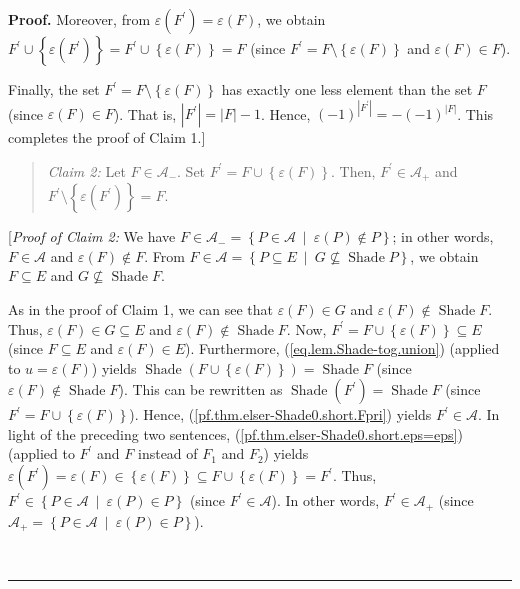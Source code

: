 \documentclass[numbers=enddot,12pt,final,onecolumn]{scrartcl}%
\theoremstyle{definition}
\newenvironment{statement}{\begin{quote}}{\end{quote}}
\newenvironment{proof}[1][Proof]{\noindent\textbf{#1.} }{\ \rule{0.5em}{0.5em}}
\newenvironment{vershort}{}{}
\begin{document}
\begin{vershort}
\begin{proof}
Moreover, from $\varepsilon\left(  F^{\prime}\right)  =\varepsilon\left(
F\right)  $, we obtain $F^{\prime}\cup\left\{  \varepsilon\left(  F^{\prime
}\right)  \right\}  =F^{\prime}\cup\left\{  \varepsilon\left(  F\right)
\right\}  =F$ (since $F^{\prime}=F\setminus\left\{  \varepsilon\left(
F\right)  \right\}  $ and $\varepsilon\left(  F\right)  \in F$).

Finally, the set $F^{\prime}=F\setminus\left\{  \varepsilon\left(  F\right)
\right\}  $ has exactly one less element than the set $F$ (since
$\varepsilon\left(  F\right)  \in F$). That is, $\left\vert F^{\prime
}\right\vert =\left\vert F\right\vert -1$. Hence, $\left(  -1\right)
^{\left\vert F^{\prime}\right\vert }=-\left(  -1\right)  ^{\left\vert
F\right\vert }$. This completes the proof of Claim 1.]

\begin{statement}
\textit{Claim 2:} Let $F\in\mathcal{A}_{-}$. Set $F^{\prime}=F\cup\left\{
\varepsilon\left(  F\right)  \right\}  $. Then, $F^{\prime}\in\mathcal{A}_{+}$
and $F^{\prime}\setminus\left\{  \varepsilon\left(  F^{\prime}\right)
\right\}  =F$.
\end{statement}

[\textit{Proof of Claim 2:} We have $F\in\mathcal{A}_{-}=\left\{
P\in\mathcal{A}\ \mid\ \varepsilon\left(  P\right)  \notin P\right\}  $; in
other words, $F\in\mathcal{A}$ and $\varepsilon\left(  F\right)  \notin F$.
From $F\in\mathcal{A}=\left\{  P\subseteq E\ \mid\ G\not \subseteq
\operatorname*{Shade}P\right\}  $, we obtain $F\subseteq E$ and
$G\not \subseteq \operatorname*{Shade}F$.

As in the proof of Claim 1, we can see that $\varepsilon\left(  F\right)  \in
G$ and $\varepsilon\left(  F\right)  \notin\operatorname*{Shade}F$. Thus,
$\varepsilon\left(  F\right)  \in G\subseteq E$ and $\varepsilon\left(
F\right)  \notin\operatorname*{Shade}F$. Now, $F^{\prime}=F\cup\left\{
\varepsilon\left(  F\right)  \right\}  \subseteq E$ (since $F\subseteq E$ and
$\varepsilon\left(  F\right)  \in E$). Furthermore,
(\ref{eq.lem.Shade-tog.union}) (applied to $u=\varepsilon\left(  F\right)  $)
yields $\operatorname*{Shade}\left(  F\cup\left\{  \varepsilon\left(
F\right)  \right\}  \right)  =\operatorname*{Shade}F$ (since $\varepsilon
\left(  F\right)  \notin\operatorname*{Shade}F$). This can be rewritten as
$\operatorname*{Shade}\left(  F^{\prime}\right)  =\operatorname*{Shade}F$
(since $F^{\prime}=F\cup\left\{  \varepsilon\left(  F\right)  \right\}  $).
Hence, (\ref{pf.thm.elser-Shade0.short.Fpri}) yields $F^{\prime}\in
\mathcal{A}$. In light of the preceding two sentences,
(\ref{pf.thm.elser-Shade0.short.eps=eps}) (applied to $F^{\prime}$ and $F$
instead of $F_{1}$ and $F_{2}$) yields $\varepsilon\left(  F^{\prime}\right)
=\varepsilon\left(  F\right)  \in\left\{  \varepsilon\left(  F\right)
\right\}  \subseteq F\cup\left\{  \varepsilon\left(  F\right)  \right\}
=F^{\prime}$. Thus, $F^{\prime}\in\left\{  P\in\mathcal{A}\ \mid
\ \varepsilon\left(  P\right)  \in P\right\}  $ (since $F^{\prime}%
\in\mathcal{A}$). In other words, $F^{\prime}\in\mathcal{A}_{+}$ (since
$\mathcal{A}_{+}=\left\{  P\in\mathcal{A}\ \mid\ \varepsilon\left(  P\right)
\in P\right\}  $).


\end{proof}
\end{vershort}
\end{document}

